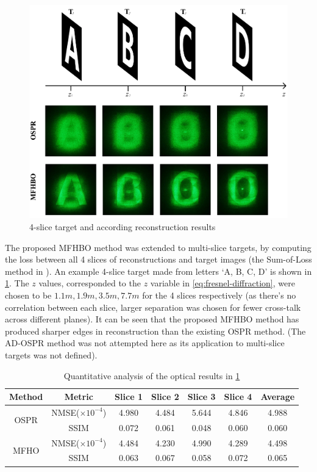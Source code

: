 	\begin{figure}[H]
		\centering
		\includegraphics[width=1.0\textwidth]{MFHO_OSPR_ABCD.pdf}
		\caption{4-slice target and according reconstruction results}
		\label{fig:MFHO_OSPR_ABCD}
	\end{figure}

	The proposed MFHBO method was extended to multi-slice targets, by computing the loss between all 4 slices of reconstructions and target images (the Sum-of-Loss method in \cite{Sha2023}). An example 4-slice target made from letters `A, B, C, D' is shown in \cref{fig:MFHO_OSPR_ABCD}. The $z$ values, corresponded to the $z$ variable in \cref{eq:fresnel-diffraction}, were chosen to be $1.1m, 1.9m, 3.5m, 7.7m$ for the 4 slices respectively (as there's no correlation between each slice, larger separation was chosen for fewer cross-talk across different planes). It can be seen that the proposed MFHBO method has produced sharper edges in reconstruction than the existing OSPR method. (The AD-OSPR method was not attempted here as its application to multi-slice targets was not defined).

	\begin{table}[H]
	\centering
	\begin{tabular}{|c|c|c|c|c|c|c|}
	\hline
	\textbf{Method} & \textbf{Metric} & \textbf{Slice 1} & \textbf{Slice 2} & \textbf{Slice 3} & \textbf{Slice 4} & \textbf{Average} \\ \hline
	\multirow{2}{*}{OSPR} & NMSE($\times 10^{-4}$) & 4.980 & 4.484 & 5.644 & 4.846 & 4.988 \\ \cline{2-7}
						  & SSIM                   & 0.072 & 0.061 & 0.048 & 0.060 & 0.060 \\ \hline
	\multirow{2}{*}{MFHO} & NMSE($\times 10^{-4}$) & 4.484 & 4.230 & 4.990 & 4.289 & 4.498 \\ \cline{2-7}
						  & SSIM                   & 0.063 & 0.067 & 0.058 & 0.072 & 0.065 \\ \hline
	\end{tabular}
	\caption{Quantitative analysis of the optical results in \cref{fig:MFHO_OSPR_ABCD}}
	\label{tab:quant_MFHO_OSPR_ABCD}
	\end{table}

